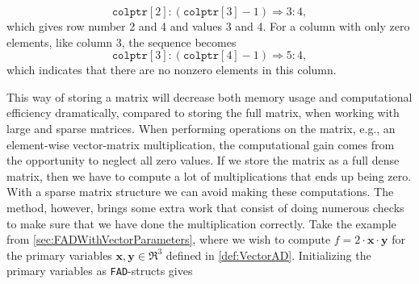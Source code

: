 \begin{equation*}
    \texttt{colptr}[2]:(\texttt{colptr}[3]-1) \Longrightarrow 3:4,
\end{equation*}
which gives row number 2 and 4 and values 3 and 4. For a column with only zero elements, like column 3, the sequence becomes
\begin{equation*}
    \texttt{colptr}[3]:(\texttt{colptr}[4]-1)\Longrightarrow 5:4,
\end{equation*}
which indicates that there are no nonzero elements in this column. 

This way of storing a matrix will decrease both memory usage and computational efficiency dramatically, compared to storing the full matrix, when working with large and sparse matrices. When performing operations on the matrix, e.g., an element-wise vector-matrix  multiplication, the computational gain comes from the opportunity to neglect all zero values. If we store the matrix as a full dense matrix, then we have to compute a lot of multiplications that ends up being zero. With a sparse matrix structure we can avoid making these computations. The method, however, brings some extra work that consist of doing numerous checks to make sure that we have done the multiplication correctly. Take the example from \autoref{sec:FADWithVectorParameters}, where we wish to compute $f = 2\cdot \textbf{x}\cdot \textbf{y}$ for the primary variables $\textbf{x},\textbf{y}\in \Re^3$ defined in \eqref{def:VectorAD}. Initializing the primary variables as \texttt{FAD}-structs gives 
